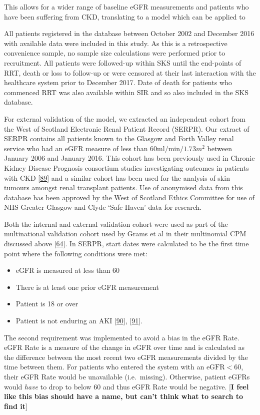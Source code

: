 \documentclass[12pt,PhD,twoside,openright]{muthesis}
\providecommand{\tightlist}{%
  \setlength{\itemsep}{0pt}\setlength{\parskip}{0pt}}
\begin{document}
This allows for a wider range of baseline eGFR measurements and patients who have been suffering from CKD, translating to a model which can be applied to

All patients registered in the database between October 2002 and December 2016 with available data were included in this study. As this is a retrospective convenience sample, no sample size calculations were performed prior to recruitment. All patients were followed-up within SKS until the end-points of RRT, death or loss to follow-up or were censored at their last interaction with the healthcare system prior to December 2017. Date of death for patients who commenced RRT was also available within SIR and so also included in the SKS database.

For external validation of the model, we extracted an independent cohort from the West of Scotland Electronic Renal Patient Record (SERPR). Our extract of SERPR contains all patients known to the Glasgow and Forth Valley renal service who had an eGFR measure of less than \(60\textrm{ml}/\textrm{min}/1.73m^2\) between January 2006 and January 2016. This cohort has been previously used in Chronic Kidney Disease Prognosis consortium studies investigating outcomes in patients with CKD {[}\protect\hyperlink{ref-matsushita_cohort_2013}{89}{]} and a similar cohort has been used for the analysis of skin tumours amongst renal transplant patients. Use of anonymised data from this database has been approved by the West of Scotland Ethics Committee for use of NHS Greater Glasgow and Clyde `Safe Haven' data for research.

Both the internal and external validation cohort were used as part of the multinational validation cohort used by Grams et al in their multinomial CPM discussed above {[}\protect\hyperlink{ref-grams_predicting_2018}{64}{]}. In SERPR, start dates were calculated to be the first time point where the following conditions were met:
\begin{itemize}
\tightlist
\item
  eGFR is measured at less than 60
\item
  There is at least one prior eGFR measurement
\item
  Patient is 18 or over
\item
  Patient is not enduring an AKI {[}\protect\hyperlink{ref-forni_renal_2017-1}{90}{]}, {[}\protect\hyperlink{ref-noauthor_kdigo_2012}{91}{]}.
\end{itemize}
The second requirement was implemented to avoid a bias in the eGFR Rate. eGFR Rate is a measure of the change in eGFR over time and is calculated as the difference between the most recent two eGFR measurements divided by the time between them. For patients who entered the system with an \(\textrm{eGFR} < 60\), their eGFR Rate would be unavailable (i.e.~missing). Otherwise, patient eGFRs would \emph{have} to drop to below 60 and thus eGFR Rate would be negative. {[}\textbf{I feel like this bias should have a name, but can't think what to search to find it}{]}
\end{document}

